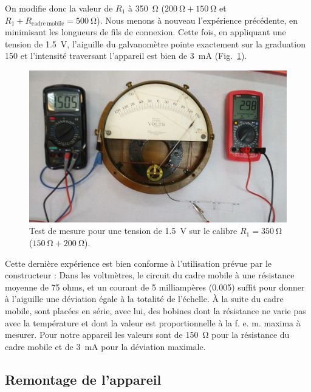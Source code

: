 \documentclass[12pt,a4paper,fleqn]{article}
\begin{document}
On modifie donc la valeur de $R_1$ à \qty{350}{\ohm} ($\qty{200}{\ohm} + \qty{150}{\ohm}$ et $R_1 + R_\mathrm{cadre\ mobile} = \qty{500}{\ohm}$).
Nous menons à nouveau l'expérience précédente, en minimisant les longueurs de fils de connexion.
Cette fois, en appliquant une tension de \qty{1,5}{V}, l'aiguille du galvanomètre pointe exactement sur la graduation \num{150} et l'intensité traversant l'appareil est bien de \qty{3}{mA} (Fig.~\ref{fig:galva_volt_good}).

\begin{figure}[htbp]
    \center
    \includegraphics[width=\linewidth]{images/20210312_112818.jpg}
    \caption{Test de mesure pour une tension de \qty{1,5}{V} sur le calibre $R_1 = \qty{350}{\ohm}$ ($\qty{150}{\ohm} + \qty{200}{\ohm}$).
    \label{fig:galva_volt_good}
}
\end{figure}

Cette dernière expérience est bien conforme à l'utilisation prévue par le constructeur : \og Dans les voltmètres, le circuit du cadre mobile à une résistance moyenne de 75 ohms, et un courant de 5 milliampères (0.005) suffit pour donner à l'aiguille une déviation égale à la totalité de l'échelle.
À la suite du cadre mobile, sont placées en série, avec lui, des bobines dont la résistance ne varie pas avec la température et dont la valeur est proportionnelle à la f. e. m. maxima à mesurer. \fg{}
Pour notre appareil les valeurs sont de \qty{150}{\ohm} pour la résistance du cadre mobile et de \qty{3}{mA} pour la déviation maximale.

\subsection{Remontage de l'appareil}
\label{sec:remontage_volt}
\end{document}
